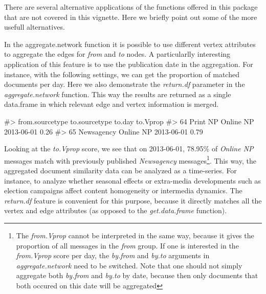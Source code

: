 There are several alternative applications of the functions offered in
this package that are not covered in this vignette. Here we briefly
point out some of the more usefull alternatives.

In the aggregate.network function it is possible to use different vertex
attributes to aggregate the edges for \emph{from} and \emph{to} nodes. A
particularlly interesting application of this feature is to use the
publication date in the aggregation. For instance, with the following
settings, we can get the proportion of matched documents per day. Here
we also demonstrate the \emph{return.df} parameter in the
\emph{aggregate.network} function. This way the results are returned as
a single data.frame in which relevant edge and vertex information is
merged.

\begin{Schunk}
\begin{Soutput}
#>    from.sourcetype to.sourcetype     to.day to.Vprop
#> 64        Print NP     Online NP 2013-06-01     0.26
#> 65      Newsagency     Online NP 2013-06-01     0.79
\end{Soutput}
\end{Schunk}

Looking at the \emph{to.Vprop} score, we see that on 2013-06-01, 78.95\% of \emph{Online NP} messages match with previously published \emph{Newsagency} messages\footnote{The \emph{from.Vprop} cannot be interpreted in the same way, because it gives the proportion of all messages in the \emph{from} group. If one is interested in the \emph{from.Vprop} score per day, the \emph{by.from} and \emph{by.to} arguments in \emph{aggregate.network} need to be switched. Note that one should not simply aggregate both \emph{by.from} and \emph{by.to} by date, because then only documents that both occured on this date will be aggregated}.
This way, the aggregated document similarity data can be analyzed as a time-series. 
For instance, to analyze whether seasonal effects or extra-media developments such as election campaigns affect content homogeneity or intermedia dynamics. 
The \emph{return.df} feature is convenient for this purpose, because it directly matches all the vertex and edge attributes (as opposed to the \emph{get.data.frame} function).

